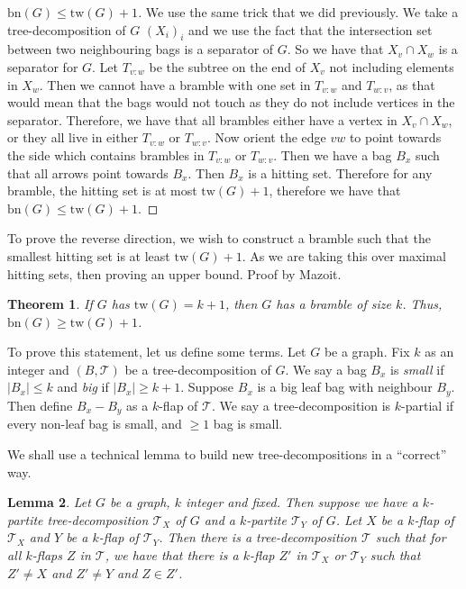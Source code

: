 \documentclass[]{article}
\newcommand{\tree}{\mathcal{T}}
\newcommand{\tw}{\text{tw}}
\newcommand{\bn}{\text{bn}}
\newtheorem{theorem}{Theorem}
\newtheorem{lemma}[theorem]{Lemma}
\theoremstyle{definition}
\numberwithin{theorem}{section}
\numberwithin{equation}{section}
\begin{document}
\begin{proof}[$\bn(G) \leq \tw(G) + 1$]
	We use the same trick that we did previously. We take a tree-decomposition of $G$ $(X_i)_i$ and we use the fact that the intersection set between two neighbouring bags is a separator of $G$. So we have that $X_v \cap X_w$ is a separator for $G$. Let $T_{v:w}$ be the subtree on the end of $X_v$ not including elements in $X_w$. Then we cannot have a bramble with one set in $T_{v:w}$ and $T_{w:v}$, as that would mean that the bags would not touch as they do not include vertices in the separator. Therefore, we have that all brambles either have a vertex in $X_v \cap X_w$, or they all live in either $T_{v: w}$ or $T_{w: v}$. Now orient the edge $vw$ to point towards the side which contains brambles in $T_{v:w}$ or $T_{w:v}$. Then we have a bag $B_x$ such that all arrows point towards $B_x$. Then $B_x$ is a hitting set. Therefore for any bramble, the hitting set is at most $\tw(G) + 1$, therefore we have that $\bn(G) \leq \tw(G) + 1$. 
\end{proof}
To prove the reverse direction, we wish to construct a bramble such that the smallest hitting set is at least $\tw(G) + 1$. As we are taking this over maximal hitting sets, then proving an upper bound. Proof by Mazoit.  
\begin{theorem}
	If $G$ has $\tw(G) = k + 1$, then $G$ has a bramble of size $k$. Thus, $\bn(G) \geq \tw(G) + 1$. 
\end{theorem}

To prove this statement, let us define some terms. Let $G$ be a graph. Fix $k$ as an integer and $(B, \tree)$ be a tree-decomposition of $G$. We say a bag $B_x$ is \textit{small} if $|B_x| \leq k$ and \textit{big} if $|B_x| \geq k + 1$. Suppose $B_x$ is a big leaf bag with neighbour $B_y$. Then define $B_x - B_y$ as a $k$-flap of $\tree$. We say a tree-decomposition is $k$-partial if every non-leaf bag is small, and $\geq 1$ bag is small. 

We shall use a technical lemma to build new tree-decompositions in a ``correct'' way.

\begin{lemma}
	Let $G$ be a graph, $k$ integer and fixed. Then suppose we have a $k$-partite tree-decomposition $\tree_X$ of $G$ and a $k$-partite $\tree_Y$ of $G$. Let $X$ be a $k$-flap of $\tree_X$ and $Y$ be a $k$-flap of $\tree_Y$. Then there is a tree-decomposition $\tree$ such that for all $k$-flaps $Z$ in $\tree$, we have that there is a $k$-flap $Z'$ in $\tree_X$ or $\tree_Y$ such that $Z' \neq X$ and $Z' \neq Y$ and $Z \in Z'$.  
\end{lemma}
\end{document}
